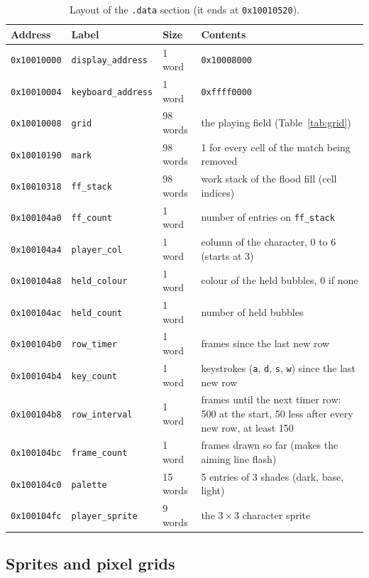 \documentclass[11pt]{article}
\newcommand{\code}[1]{\texttt{#1}}
\begin{document}
\begin{table}[H]
\centering
\small
\begin{tabular}{@{}lllp{7.2cm}@{}}
\toprule
Address & Label & Size & Contents\\
\midrule
\code{0x10010000} & \code{display\_address} & 1 word & \code{0x10008000}\\
\code{0x10010004} & \code{keyboard\_address} & 1 word & \code{0xffff0000}\\
\code{0x10010008} & \code{grid} & 98 words & the playing field (Table~\ref{tab:grid})\\
\code{0x10010190} & \code{mark} & 98 words & 1 for every cell of the match being removed\\
\code{0x10010318} & \code{ff\_stack} & 98 words & work stack of the flood fill (cell indices)\\
\code{0x100104a0} & \code{ff\_count} & 1 word & number of entries on \code{ff\_stack}\\
\code{0x100104a4} & \code{player\_col} & 1 word & column of the character, 0 to 6 (starts at 3)\\
\code{0x100104a8} & \code{held\_colour} & 1 word & colour of the held bubbles, 0 if none\\
\code{0x100104ac} & \code{held\_count} & 1 word & number of held bubbles\\
\code{0x100104b0} & \code{row\_timer} & 1 word & frames since the last new row\\
\code{0x100104b4} & \code{key\_count} & 1 word & keystrokes (\code{a}, \code{d}, \code{s}, \code{w}) since the last new row\\
\code{0x100104b8} & \code{row\_interval} & 1 word & frames until the next timer row: 500 at the start, 50 less after every new row, at least 150\\
\code{0x100104bc} & \code{frame\_count} & 1 word & frames drawn so far (makes the aiming line flash)\\
\midrule
\code{0x100104c0} & \code{palette} & 15 words & 5 entries of 3 shades (dark, base, light)\\
\code{0x100104fc} & \code{player\_sprite} & 9 words & the $3 \times 3$ character sprite\\
\bottomrule
\end{tabular}
\caption{Layout of the \code{.data} section (it ends at \code{0x10010520}).}
\label{tab:memory}
\end{table}

\subsection{Sprites and pixel grids}
\end{document}
